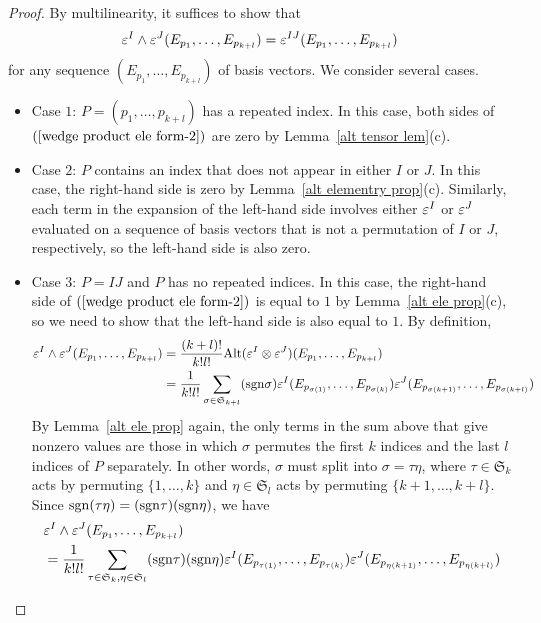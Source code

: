 \begin{proof}
By multilinearity, it suffices to show that
\begin{align}\label{wedge product ele form-2}
\varepsilon^I\wedge\varepsilon^J(E_{p_1},\dots,E_{p_{k+l}})=\varepsilon^{IJ}(E_{p_1},\dots,E_{p_{k+l}})
\end{align}
for any sequence $(E_{p_1},\dots,E_{p_{k+l}})$ of basis vectors. We consider several cases.
\begin{itemize}
\item Case $1$: $P=(p_1,\dots,p_{k+l})$ has a repeated index. In this case, both sides of $(\ref{wedge product ele form-2})$ are zero by Lemma~\ref{alt tensor lem}(c).
\item Case $2$: $P$ contains an index that does not appear in either $I$ or $J$. In this case, the right-hand side is zero by Lemma~\ref{alt elementry prop}(c). Similarly, each term in the expansion of the left-hand side involves either $\varepsilon^I$ or $\varepsilon^J$ evaluated on a sequence of basis vectors that is not a permutation of $I$ or $J$, respectively, so the left-hand side is also zero.
\item Case $3$: $P=IJ$ and $P$ has no repeated indices. In this case, the right-hand side of $(\ref{wedge product ele form-2})$ is equal to $1$ by Lemma~\ref{alt ele prop}(c), so we need to show that the left-hand side is also equal to $1$. By definition,
\begin{align*}
\varepsilon^I\wedge\varepsilon^J(E_{p_1},\dots,E_{p_{k+l}})&=\frac{(k+l)!}{k!l!}\mathrm{Alt}(\varepsilon^I\otimes\varepsilon^J)(E_{p_1},\dots,E_{p_{k+l}})\\
&=\frac{1}{k!l!}\sum_{\sigma\in\mathfrak{S}_{k+l}}(\mathrm{sgn}\sigma)\varepsilon^I(E_{p_{\sigma(1)}},\dots,E_{p_{\sigma(k)}})\varepsilon^J(E_{p_{\sigma(k+1)}},\dots,E_{p_{\sigma(k+l)}})
\end{align*}
By Lemma~\ref{alt ele prop} again, the only terms in the sum above that give nonzero values are those in which $\sigma$ permutes the first $k$ indices and the last $l$ indices of $P$ separately. In other words, $\sigma$ must split into $\sigma=\tau\eta$, where $\tau\in\mathfrak{S}_k$ acts by permuting $\{1,\dots,k\}$ and $\eta\in\mathfrak{S}_l$ acts by permuting $\{k+1,\dots,k+l\}$. Since $\mathrm{sgn}(\tau\eta)=(\mathrm{sgn}\tau)(\mathrm{sgn}\eta)$, we have
\begin{align*}
&\eps^I\wedge\eps^J(E_{p_1},\dots,E_{p_{k+l}})\\
&=\frac{1}{k!l!}\sum_{\tau\in\mathfrak{S}_{k},\eta\in\mathfrak{S}_l}(\sgn\tau)(\sgn\eta)\eps^I(E_{p_{\tau(1)}},\dots,E_{p_{\tau(k)}})\eps^J(E_{p_{\eta(k+1)}},\dots,E_{p_{\eta(k+l)}})\\

\end{align*}
\end{itemize}
\end{proof}
